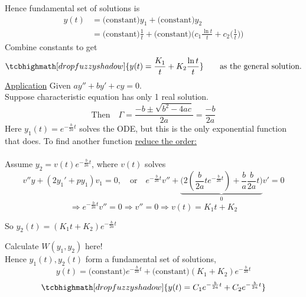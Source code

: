 Hence fundamental set of solutions is 
\begin{align*}
	y(t) & = \text{(constant)}y_1 + \text{(constant)}y_2\\
	& = \text{(constant)} \frac{1}{t} + \text{(constant)} \bigg(c_1 \frac{\ln t}{t} + c_2 \big(\frac{1}{t}\big)\bigg)
\end{align*}
Combine constants to get
\begin{equation*}
	\tcbhighmath[drop fuzzy shadow]{y(t) = \frac{K_1}{t} + K_2 \frac{\ln t}{t}} \quad \quad \text{as the general solution.}
\end{equation*}
\underline{Application} Given $ay'' + by' + cy = 0$.\\
Suppose characteristic equation has only 1 real solution.
\begin{equation*}
	\text{Then} \quad \Gamma = \frac{-b \pm \sqrt{b^2 - 4ac}}{2a} = \frac{-b}{2a}
\end{equation*}
Here $y_1(t) = e^{-\frac{b}{2a}t}$ solves the ODE, but this is the only exponential function that does. To find another function \underline{reduce the order:}\\\\
Assume $y_2 = v(t) e^{-\frac{b}{2a}t}$, where $v(t)$ solves
\begin{equation*}
	v''y + (2y_1' + py_1)v_1 = 0, \quad \text{or} \quad e^{-\frac{b}{2a}t}v'' + \underbrace{\bigg( 2(\frac{b}{2a}t e^{-\frac{b}{2a}t}) + \frac{b}{a} \frac{b}{2a}t\bigg)}_{0}v' = 0 
\end{equation*}
\begin{equation*}
	\Rightarrow e^{-\frac{b}{2a}t}v'' = 0 \Rightarrow v'' = 0 \Rightarrow v(t) = K_1 t + K_2
\end{equation*}
\begin{center}
	So $y_2(t) = (K_1 t + K_2) e^{-\frac{b}{2a}t}$
\end{center}
\begin{exercise}
Calculate $W(y_1, y_2)$ here!\\
Hence  $y_1(t), y_2(t)$ form a fundamental set of solutions,
\begin{equation*}
	y(t) = \text{(constant)} e^{-\frac{b}{2a}t} + \text{(constant)}(K_1 + K_2) e^{-\frac{b}{2a}t} 
\end{equation*}
\begin{equation*}
	\tcbhighmath[drop fuzzy shadow]{y(t) = C_1 e^{-\frac{b}{2a}t} + C_2 e^{-\frac{b}{2a}t}}
\end{equation*}
\end{exercise}
\redhline
